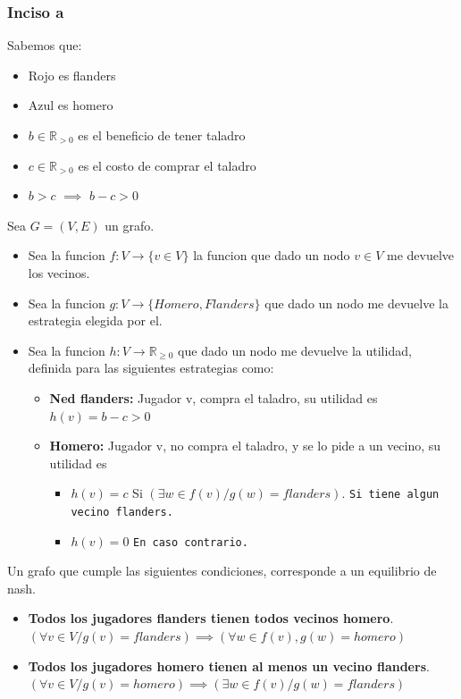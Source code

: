 \subsubsection{Inciso a}
Sabemos que:
\begin{itemize}
	\item Rojo es flanders
	\item Azul es homero
	\item $b \in \mathbb{R}_{>0}$ es el beneficio de tener taladro
	\item $c \in \mathbb{R}_{>0}$ es el costo de comprar el taladro
	\item $b > c$ $ \implies $ $ b - c > 0$  
\end{itemize}

\begin{definition}	
Sea $G=(V, E)$ un grafo. 
\begin{itemize}
	\item Sea la funcion $f:V \rightarrow \{v \in V\}$ la funcion que dado un nodo $v \in V$ me devuelve los vecinos.
	\item Sea la funcion $g:V \rightarrow \{Homero, Flanders\}$ que dado un nodo me devuelve la estrategia elegida por el. 
	\item Sea la funcion $h: V \rightarrow \mathbb{R}_{\geq 0}$ que dado un nodo me devuelve la utilidad, definida para las siguientes estrategias como:
	\begin{itemize}
		\item \textbf{Ned flanders:} Jugador v, compra el taladro, su utilidad es $h(v) = b-c > 0$  
		\item \textbf{Homero:} Jugador v, no compra el taladro, y se lo pide a un vecino, su utilidad es
		\begin{itemize}
			\item $h(v) = c$  Si $(\exists w \in f(v)/ g(w) = flanders)$. \texttt{Si tiene algun vecino flanders.}
			\item $h(v) = 0$  \texttt{En caso contrario.}
		\end{itemize}	 
	\end{itemize}
\end{itemize}
\end{definition}

\begin{theorem}
	\label{ida-caracterizacion-nash}
	Un grafo que cumple las siguientes condiciones, corresponde a un equilibrio de nash.
	\begin{itemize}
		\item \textbf{Todos los jugadores flanders tienen todos vecinos homero}. $(\forall v \in V / g(v) = flanders) \implies (\forall w \in f(v), g(w) = homero)$ 

		\item \textbf{Todos los jugadores homero tienen al menos un vecino flanders}. $(\forall v \in V / g(v) = homero) \implies (\exists w \in f(v)/ g(w) = flanders)$ 
	\end{itemize}
\end{theorem}

